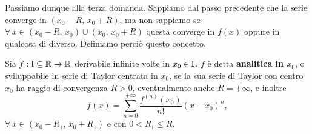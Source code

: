 \documentclass[../../analisi2]{subfiles}
\begin{document}
        Passiamo dunque alla terza domanda. Sappiamo dal passo precedente che la serie converge in \((x_0 - R, \, x_0 + R)\), ma non
        sappiamo se \(\forall \, x \in (x_0 - R, \, x_0) \cup (x_0, \, x_0 + R)\) questa converge in \(f(x)\) oppure in qualcosa di
        diverso. Definiamo perciò questo concetto.

        \begin{definizione}
            Sia \(f : \mathrm{I} \subseteq \mathbb{R} \to \mathbb{R}\) derivabile infinite volte in \(x_0 \in \mathrm{I}\). \(f\) è detta \textbf{analitica in \(x_0\)},
            o sviluppabile in serie di Taylor centrata in \(x_0\), se la sua serie di Taylor con centro \(x_0\) ha raggio di convergenza
            \(R > 0\), eventualmente anche \(R = +\infty\), e inoltre
            \[
                f(x) = \sum_{n = 0}^{+\infty} \frac{f^{(n)} (x_0)}{n!} (x - x_0)^n,
            \]
            \(\forall \, x \in (x_0 - R_1, \, x_0 + R_1)\) e con \(0 < R_1 \leqslant R\).
        \end{definizione}
\end{document}
